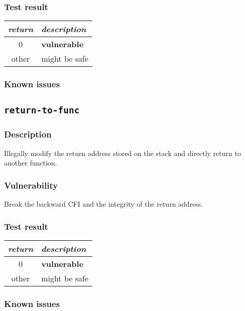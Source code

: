 \documentclass[a4paper]{book}
\begin{document}
\subsubsection{Test result}
\begin{tabular}{cl}
  \toprule
  \emph{return}  & \emph{description} \\
  \midrule
  0              & \textbf{vulnerable} \\
  other          & might be safe \\
  \bottomrule
\end{tabular}
  
\subsubsection{Known issues}

\newpage
\subsection{\texttt{return-to-func}}\label{test-return-to-func}

\subsubsection{Description}
Illegally modify the return address stored on the stack and directly return to another function.

\subsubsection{Vulnerability}
Break the backward CFI and the integrity of the return address.

\subsubsection{Test result}
\begin{tabular}{cl}
  \toprule
  \emph{return}  & \emph{description} \\
  \midrule
  0              & \textbf{vulnerable} \\
  other          & might be safe \\
  \bottomrule
\end{tabular}
  
\subsubsection{Known issues}

\newpage
\end{document}
